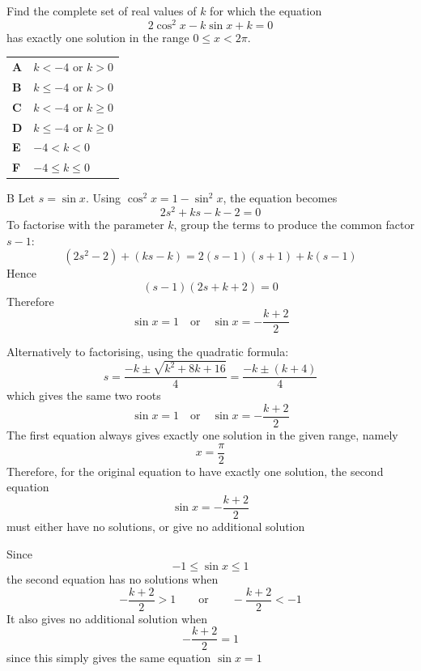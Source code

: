 \documentclass[11pt,a4paper]{article}
\begin{document}
\clearpage
\thispagestyle{djssolutions}
\vspace*{8pt}
\begin{enumerate}[label=\textbf{\arabic*.},leftmargin=*,itemsep=0pt,start=17]
\questionitem[Trigonometry]
Find the complete set of real values of $k$ for which the equation
\[
2\cos^2 x - k\sin x + k = 0
\]
has exactly one solution in the range $0 \le x < 2\pi$.

\par\vspace*{12pt}
\begin{tabularx}{\linewidth}{@{}>{\bfseries}l Y@{}}
A &
$k < -4$ or $k > 0$
\\[0.8em]
B &
$k \le -4$ or $k > 0$
\\[0.8em]
C &
$k < -4$ or $k \ge 0$
\\[0.8em]
D &
$k \le -4$ or $k \ge 0$
\\[0.8em]
E &
$-4 < k < 0$
\\[0.8em]
F &
$-4 \le k \le 0$
\\
\end{tabularx}

\begin{djsSolution}{B}
Let $s=\sin x$. Using $\cos^2x=1-\sin^2x$, the equation becomes
\[
2s^2+ks-k-2=0
\]
To factorise with the parameter $k$, group the terms to produce the common factor $s-1$:
\[
(2s^2-2)+(ks-k)=2(s-1)(s+1)+k(s-1)
\]
Hence
\[
(s-1)(2s+k+2)=0
\]
Therefore
\[
\sin x=1 \quad\text{or}\quad \sin x=-\frac{k+2}{2}
\]

Alternatively to factorising, using the quadratic formula:
\[
s=\frac{-k\pm\sqrt{k^2+8k+16}}{4}
=\frac{-k\pm(k+4)}{4}
\]
which gives the same two roots
\[
\sin x=1 \quad\text{or}\quad \sin x=-\frac{k+2}{2}
\]
The first equation always gives exactly one solution in the given range, namely
\[
x=\frac{\pi}{2}
\]
Therefore, for the original equation to have exactly one solution, the second equation
\[
\sin x=-\frac{k+2}{2}
\]
must either have no solutions, or give no additional solution

Since
\[
-1\leq \sin x\leq 1
\]
the second equation has no solutions when
\[
-\frac{k+2}{2}>1
\qquad\text{or}\qquad
-\frac{k+2}{2}<-1
\]
It also gives no additional solution when
\[
-\frac{k+2}{2}=1
\]
since this simply gives the same equation \(\sin x=1\)


\end{djsSolution}
\end{enumerate}
\end{document}
